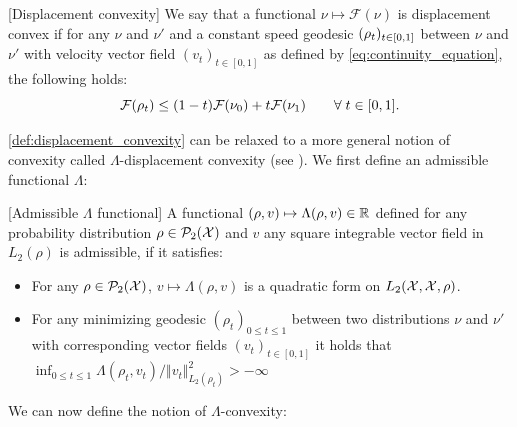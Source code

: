 \begin{definition}\label{def:displacement_convexity}[Displacement convexity] 
We say that a functional $\nu\mapsto\mathcal{F}(\nu)$ is displacement convex
	if for any $\nu$ and $\nu'$ and a constant speed geodesic $(\text{\ensuremath{\rho_{t}}})_{t \in [0,1]}$
	between $\nu$ and $\nu'$ with velocity vector field $(v_{t})_{t \in [0,1]}$ as defined by \cref{eq:continuity_equation},
	the following holds:
	\begin{equation}\label{eq:displacement_convex}
		{{\mathcal F}}(\rho_{t})\leq(1-t){{\mathcal F}}(\nu_{0})+t{{\mathcal F}}(\nu_{1}) \qquad\forall\; t\in[0,1].
	\end{equation}
\end{definition}
\cref{def:displacement_convexity} can be relaxed to a more general notion of convexity called $\Lambda$-displacement convexity (see \cite[Definition 16.5]{Villani:2009}). We first define an admissible functional $\Lambda$:
\begin{definition}\label{def:conditions_lambda}[Admissible $\Lambda$ functional]
	A functional $(\rho,v)\mapsto \Lambda(\rho,v) \in {{\mathbb R}}$  defined for any probability distribution $\rho\in \mathcal{P}_2({{\mathcal X}})$ and $v$ any square integrable vector field in $L_2(\rho)$ is admissible, if it satisfies:
	\begin{itemize}
	\item For any $\rho \in \mathcal{P}_2({{\mathcal X}})$,  $v\mapsto \Lambda(\rho,v)$ is a quadratic form on $L_2({{\mathcal X}},{{\mathcal X}},\rho)$.
	\item For any minimizing geodesic $(\rho_t)_{0\leq t\leq 1}$ between two distributions $\nu$ and $\nu'$ with corresponding vector fields $(v_t)_{t \in [0,1]}$ it holds that $\inf_{0\leq t\leq 1}\Lambda(\rho_t,v_t)/\Vert v_t\Vert_{L_{2}(\rho_t)}^{2}>-\infty$ 
\end{itemize}
\end{definition}
We can now define the notion of $\Lambda$-convexity:
